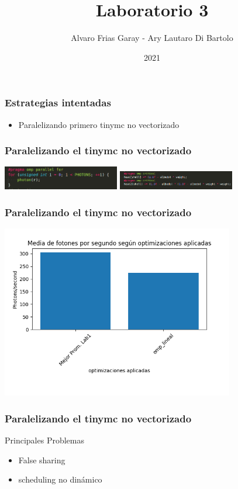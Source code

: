 \documentclass{beamer}
\title{Laboratorio 3}
\author{Alvaro Frias Garay - Ary Lautaro Di Bartolo}
\institute{Universidad Nacional de Córdoba - Universidad Nacional de Cuyo}
\date{2021}
\begin{document}
    \frame{\titlepage}

    \begin{frame}
        \frametitle{Estrategias intentadas}
        \begin{itemize}
            \item Paralelizando primero tinymc no vectorizado
        \end{itemize}
    \end{frame}

    \begin{frame}
        \frametitle{Paralelizando el tinymc no vectorizado}

        \includegraphics[width=2in]{imagenes/opt_omp_lin_1.png} \pause
        \includegraphics[width=2in]{imagenes/opt_omp_lin_2.png}
    \end{frame}

    \begin{frame}
        \frametitle{Paralelizando el tinymc no vectorizado}
        \includegraphics[width=4in]{imagenes/comp_prom_1.png}
    \end{frame}

    \begin{frame}
        \frametitle{Paralelizando el tinymc no vectorizado}
        Principales Problemas
        \begin{itemize}
            \item False sharing
            \item scheduling no dinámico
        \end{itemize}
    \end{frame}
\end{document}
